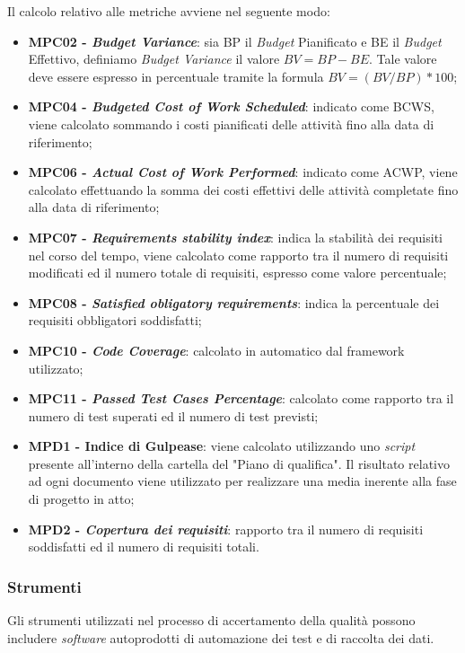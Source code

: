 Il calcolo relativo alle metriche avviene nel seguente modo:
\begin{itemize}
	\item \textbf{MPC02 - \textit{Budget Variance}}: sia BP il \textit{Budget} Pianificato e BE il \textit{Budget} Effettivo, definiamo \textit{Budget Variance} il valore $BV = BP - BE$.
	    Tale valore deve essere espresso in percentuale tramite la formula $BV = (BV / BP) * 100$;
	\item \textbf{MPC04 - \textit{Budgeted Cost of Work Scheduled}}: indicato come BCWS, viene calcolato sommando i costi pianificati delle attività fino alla data di riferimento;
	\item \textbf{MPC06 - \textit{Actual Cost of Work Performed}}: indicato come ACWP, viene calcolato effettuando la somma dei costi effettivi delle attività completate fino alla data di riferimento;
	\item \textbf{MPC07 - \textit{Requirements stability index}}: indica la stabilità dei requisiti nel corso del tempo, viene calcolato come rapporto tra il numero di requisiti modificati ed il numero totale di requisiti, espresso come valore percentuale;
	\item \textbf{MPC08 - \textit{Satisfied obligatory requirements}}: indica la percentuale dei requisiti obbligatori soddisfatti;
	\item \textbf{MPC10 - \textit{Code Coverage}}: calcolato in automatico dal framework utilizzato;
	\item \textbf{MPC11 - \textit{Passed Test Cases Percentage}}: calcolato come rapporto tra il numero di test superati ed il numero di test previsti;
	\item \textbf{MPD1 - Indice di Gulpease}: viene calcolato utilizzando uno \textit{script} presente all'interno della cartella del "Piano di qualifica".
	      Il risultato relativo ad ogni documento viene utilizzato per realizzare una media inerente alla fase di progetto in atto;
	\item \textbf{MPD2 - \textit{Copertura dei requisiti}}: rapporto tra il numero di requisiti soddisfatti ed il numero di requisiti totali.
\end{itemize}

\subsubsection*{Strumenti}
Gli strumenti utilizzati nel processo di accertamento della qualità possono
includere \textit{software} autoprodotti di automazione dei test e di raccolta
dei dati.
